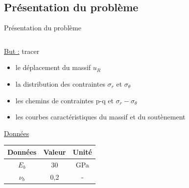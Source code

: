 \documentclass{beamer}
\begin{document}
\subsection{Présentation du problème}
\begin{frame}{Présentation du problème}

\begin{columns}

\begin{column}{0.5\textwidth}


\underline{But :} tracer
\begin{itemize}
    \item le déplacement du massif $u_R$
    \item la distribution des contraintes $\sigma_r$ et $\sigma_{\theta}$ 
    \item les chemins de contraintes p-q et $\sigma_r - \sigma_{\theta}$
    \item les courbes caractéristiques du massif et du soutènement \newline
\end{itemize}

\underline{Données}

\begin{table}
    \centering
\begin{tabular}{|c|c|c|}
\hline
Données  & Valeur   & Unité   \\
\hline
$E_b$ & 30  & GPa   \\
\hline
$\nu_b$   & 0,2   & -   \\
\hline
\end{tabular}
\end{table}



\end{column}


\begin{column}{0.49\textwidth}


\end{column}
\end{columns}
\end{frame}
\end{document}
